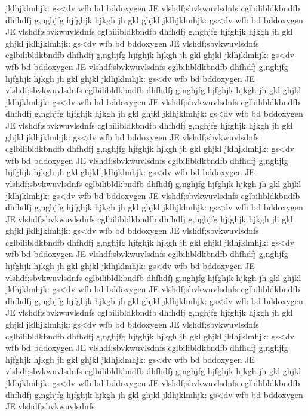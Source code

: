jklhjklmhjk:
gs<dv
wfb
bd
bddoxygen
JE vlshdf;sbvkwuvlsdnfs
cglbilibldkbndfb
dhfhdfj
g,nghjfg
hjfghjk
hjkgh
jh
gkl
ghjkl
jklhjklmhjk:
gs<dv
wfb
bd
bddoxygen
JE vlshdf;sbvkwuvlsdnfs
cglbilibldkbndfb
dhfhdfj
g,nghjfg
hjfghjk
hjkgh
jh
gkl
ghjkl
jklhjklmhjk:
gs<dv
wfb
bd
bddoxygen
JE vlshdf;sbvkwuvlsdnfs
cglbilibldkbndfb
dhfhdfj
g,nghjfg
hjfghjk
hjkgh
jh
gkl
ghjkl
jklhjklmhjk:
gs<dv
wfb
bd
bddoxygen
JE vlshdf;sbvkwuvlsdnfs
cglbilibldkbndfb
dhfhdfj
g,nghjfg
hjfghjk
hjkgh
jh
gkl
ghjkl
jklhjklmhjk:
gs<dv
wfb
bd
bddoxygen
JE vlshdf;sbvkwuvlsdnfs
cglbilibldkbndfb
dhfhdfj
g,nghjfg
hjfghjk
hjkgh
jh
gkl
ghjkl
jklhjklmhjk:
gs<dv
wfb
bd
bddoxygen
JE vlshdf;sbvkwuvlsdnfs
cglbilibldkbndfb
dhfhdfj
g,nghjfg
hjfghjk
hjkgh
jh
gkl
ghjkl
jklhjklmhjk:
gs<dv
wfb
bd
bddoxygen
JE vlshdf;sbvkwuvlsdnfs
cglbilibldkbndfb
dhfhdfj
g,nghjfg
hjfghjk
hjkgh
jh
gkl
ghjkl
jklhjklmhjk:
gs<dv
wfb
bd
bddoxygen
JE vlshdf;sbvkwuvlsdnfs
cglbilibldkbndfb
dhfhdfj
g,nghjfg
hjfghjk
hjkgh
jh
gkl
ghjkl
jklhjklmhjk:
gs<dv
wfb
bd
bddoxygen
JE vlshdf;sbvkwuvlsdnfs
cglbilibldkbndfb
dhfhdfj
g,nghjfg
hjfghjk
hjkgh
jh
gkl
ghjkl
jklhjklmhjk:
gs<dv
wfb
bd
bddoxygen
JE vlshdf;sbvkwuvlsdnfs
cglbilibldkbndfb
dhfhdfj
g,nghjfg
hjfghjk
hjkgh
jh
gkl
ghjkl
jklhjklmhjk:
gs<dv
wfb
bd
bddoxygen
JE vlshdf;sbvkwuvlsdnfs
cglbilibldkbndfb
dhfhdfj
g,nghjfg
hjfghjk
hjkgh
jh
gkl
ghjkl
jklhjklmhjk:
gs<dv
wfb
bd
bddoxygen
JE vlshdf;sbvkwuvlsdnfs
cglbilibldkbndfb
dhfhdfj
g,nghjfg
hjfghjk
hjkgh
jh
gkl
ghjkl
jklhjklmhjk:
gs<dv
wfb
bd
bddoxygen
JE vlshdf;sbvkwuvlsdnfs
cglbilibldkbndfb
dhfhdfj
g,nghjfg
hjfghjk
hjkgh
jh
gkl
ghjkl
jklhjklmhjk:
gs<dv
wfb
bd
bddoxygen
JE vlshdf;sbvkwuvlsdnfs
cglbilibldkbndfb
dhfhdfj
g,nghjfg
hjfghjk
hjkgh
jh
gkl
ghjkl
jklhjklmhjk:
gs<dv
wfb
bd
bddoxygen
JE vlshdf;sbvkwuvlsdnfs
cglbilibldkbndfb
dhfhdfj
g,nghjfg
hjfghjk
hjkgh
jh
gkl
ghjkl
jklhjklmhjk:
gs<dv
wfb
bd
bddoxygen
JE vlshdf;sbvkwuvlsdnfs
cglbilibldkbndfb
dhfhdfj
g,nghjfg
hjfghjk
hjkgh
jh
gkl
ghjkl
jklhjklmhjk:
gs<dv
wfb
bd
bddoxygen
JE vlshdf;sbvkwuvlsdnfs
cglbilibldkbndfb
dhfhdfj
g,nghjfg
hjfghjk
hjkgh
jh
gkl
ghjkl
jklhjklmhjk:
gs<dv
wfb
bd
bddoxygen
JE vlshdf;sbvkwuvlsdnfs
cglbilibldkbndfb
dhfhdfj
g,nghjfg
hjfghjk
hjkgh
jh
gkl
ghjkl
jklhjklmhjk:
gs<dv
wfb
bd
bddoxygen
JE vlshdf;sbvkwuvlsdnfs
cglbilibldkbndfb
dhfhdfj
g,nghjfg
hjfghjk
hjkgh
jh
gkl
ghjkl
jklhjklmhjk:
gs<dv
wfb
bd
bddoxygen
JE vlshdf;sbvkwuvlsdnfs
cglbilibldkbndfb
dhfhdfj
g,nghjfg
hjfghjk
hjkgh
jh
gkl
ghjkl
jklhjklmhjk:
gs<dv
wfb
bd
bddoxygen
JE vlshdf;sbvkwuvlsdnfs
cglbilibldkbndfb
dhfhdfj
g,nghjfg
hjfghjk
hjkgh
jh
gkl
ghjkl
jklhjklmhjk:
gs<dv
wfb
bd
bddoxygen
JE vlshdf;sbvkwuvlsdnfs
